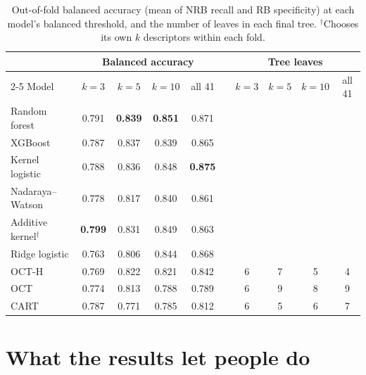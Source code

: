 \documentclass[11pt]{article}
\begin{document}
\begin{table}[t]
\centering
\small
\begin{tabular}{l cccc c cccc}
\toprule
 & \multicolumn{4}{c}{Balanced accuracy} & & \multicolumn{4}{c}{Tree leaves} \\
\cmidrule{2-5} \cmidrule{7-10}
Model & $k=3$ & $k=5$ & $k=10$ & all 41 & & $k=3$ & $k=5$ & $k=10$ & all 41 \\
\midrule
Random forest        & 0.791 & \textbf{0.839} & \textbf{0.851} & 0.871 & & & & & \\
XGBoost              & 0.787 & 0.837 & 0.839 & 0.865 & & & & & \\
Kernel logistic      & 0.788 & 0.836 & 0.848 & \textbf{0.875} & & & & & \\
Nadaraya--Watson     & 0.778 & 0.817 & 0.840 & 0.861 & & & & & \\
\midrule
Additive kernel$^\dagger$ & \textbf{0.799} & 0.831 & 0.849 & 0.863 & & & & & \\
Ridge logistic       & 0.763 & 0.806 & 0.844 & 0.868 & & & & & \\
OCT-H                & 0.769 & 0.822 & 0.821 & 0.842 & & 6 & 7 & 5 & 4 \\
OCT                  & 0.774 & 0.813 & 0.788 & 0.789 & & 6 & 9 & 8 & 9 \\
CART                 & 0.787 & 0.771 & 0.785 & 0.812 & & 6 & 5 & 6 & 7 \\
\bottomrule
\end{tabular}
\caption{Out-of-fold balanced accuracy (mean of NRB recall and RB specificity) at each model's
balanced threshold, and the number of leaves in each final tree. $^\dagger$Chooses its own $k$
descriptors within each fold.}
\end{table}

\section*{What the results let people do}
\end{document}
